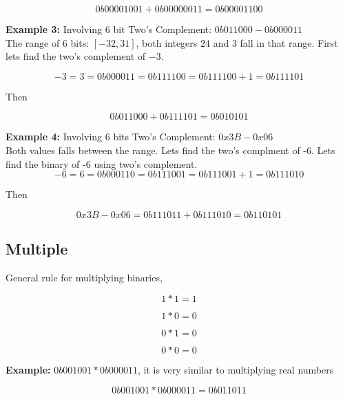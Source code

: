\documentclass{article}
\begin{document}
\[
0b0000 1001 + 0b0000 0011 = 0b0000 1100
\]

\noindent \textbf{Example 3:} Involving 6 bit Two's Complement: $0b011 000 - 
0b000 011$ \\

The range of 6 bits: $[-32,31]$, both integers $24$ and $3$ fall in that range.
First lets find the two's complement of $-3$. 

\[
-3 = 3 = 0b000 011 = 0b111 100 = 0b111 100 + 1 = 0b111 101
\]

Then

\[
0b011 000 + 0b111 101 = 0b010101
\]

\noindent \textbf{Example 4:} Involving 6 bits Two's Complement: $0x3B - 0x06$ \\

Both values falls between the range. Lets find the two's complment of -6. Lets find the binary of -6 using two's 
complement.\\

\[
-6 = 6 = 0b000 110 = 0b111 001 = 0b111 001 + 1 = 0b111 010
\]

Then 

\[
0x3B - 0x06 = 0b11 1011 + 0b111 010 = 0b110 101
\]

\subsection*{Multiple} 
\noindent General rule for multiplying binaries,

\[
1 * 1 = 1
\]

\[
1 * 0 = 0
\]

\[
0 * 1 = 0
\]

\[
0 * 0 = 0
\]

\noindent \textbf{Example:} $0b001001 * 0b000011$, it is very similar to multiplying real numbers

\[
0b001001 * 0b000011 = 0b011011
\]
\end{document}
